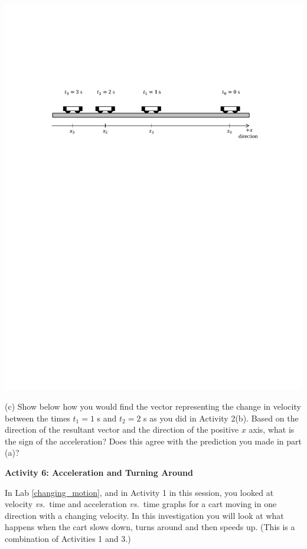 {\par\centering \includegraphics{slowing/carts_slowing2.pdf} \par}

(c) Show below how you would find the vector representing the change in velocity
between the times $t_1 = 1$ s and $t_2 = 2$ s as you did in Activity 2(b). Based on the 
direction of the resultant vector and the direction of the positive $x$ axis, 
what is the sign of the acceleration?  Does this agree with the prediction you made in part (a)?
\answerspace{10mm}

\pagebreak[2]
\textbf{Activity 6: Acceleration and Turning Around }

In Lab \ref{changing_motion}, and in Activity 1 in this session, you looked at
velocity \textit{vs.}~time and acceleration \textit{vs.}~time graphs for a cart moving in one
direction with a changing velocity. In this investigation you will look at what
happens when the cart slows down, turns around and then speeds up. (This is a
combination of Activities 1 and 3.)


